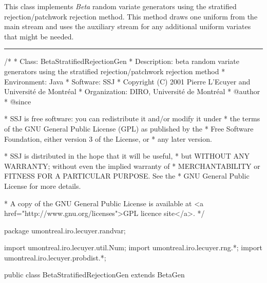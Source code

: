 
This class implements {\em Beta\/} random variate generators using
 the stratified rejection/patch\-work rejection
 method.
 This method draws one uniform from the main stream and uses  the 
auxiliary stream for any additional uniform variates that might be needed.

\bigskip\hrule

\begin{code}
\begin{hide}
/*
 * Class:        BetaStratifiedRejectionGen
 * Description:  beta random variate generators using the stratified 
                 rejection/patchwork rejection method
 * Environment:  Java
 * Software:     SSJ 
 * Copyright (C) 2001  Pierre L'Ecuyer and Université de Montréal
 * Organization: DIRO, Université de Montréal
 * @author       
 * @since

 * SSJ is free software: you can redistribute it and/or modify it under
 * the terms of the GNU General Public License (GPL) as published by the
 * Free Software Foundation, either version 3 of the License, or
 * any later version.

 * SSJ is distributed in the hope that it will be useful,
 * but WITHOUT ANY WARRANTY; without even the implied warranty of
 * MERCHANTABILITY or FITNESS FOR A PARTICULAR PURPOSE.  See the
 * GNU General Public License for more details.

 * A copy of the GNU General Public License is available at
   <a href="http://www.gnu.org/licenses">GPL licence site</a>.
 */
\end{hide}
package umontreal.iro.lecuyer.randvar;\begin{hide}
import umontreal.iro.lecuyer.util.Num;
import umontreal.iro.lecuyer.rng.*;
import umontreal.iro.lecuyer.probdist.*;
\end{hide}

public class BetaStratifiedRejectionGen extends BetaGen \begin{hide} {
    
   private RandomStream auxStream;
   private int gen;

   // Parameters for stratified rejection/patchwork rejection
   private static final int b00 = 2;
   private static final int b01 = 3;
   private static final int b01inv = 4;
   private static final int b1prs = 5;
   private double pint;
   private double qint;
   private double p_;
   private double q_;
   private double c;
   private double t;
   private double fp;
   private double fq;
   private double ml;
   private double mu;
   private double p1;
   private double p2;
   private double s;
   private double m;
   private double D;
   private double Dl;
   private double x1;
   private double x2;
   private double x4;
   private double x5;
   private double f1;
   private double f2;
   private double f4;
   private double f5;
   private double ll;
   private double lr;
   private double z2;
   private double z4;
   private double p3;
   private double p4;
\end{hide}
\end{code}

